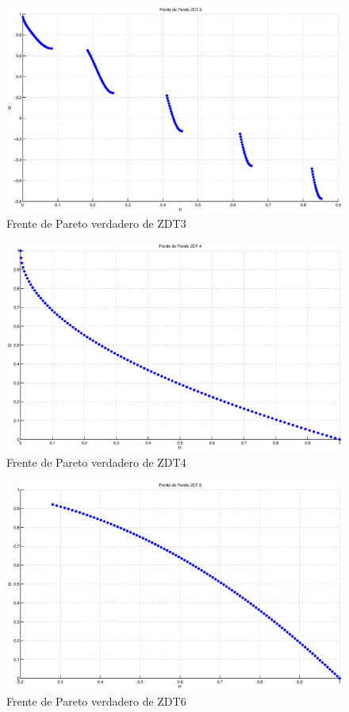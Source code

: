\begin{figure}
\centering
    \centering
    \includegraphics[scale=0.4]{ApendiceA/paretoZDT3.eps}
    \caption{Frente de Pareto verdadero de ZDT3}
    \label{fig:zdt3}
\end{figure}

\begin{figure}
\centering
    \centering
    \includegraphics[scale=0.4]{ApendiceA/paretoZDT4.eps}
    \caption{Frente de Pareto verdadero de ZDT4}
    \label{fig:zdt4}
\end{figure}
\begin{figure}
\centering
    \centering
    \includegraphics[scale=0.4]{ApendiceA/paretoZDT6.eps}
    \caption{Frente de Pareto verdadero de ZDT6}
    \label{fig:zdt6}
 
\end{figure}

